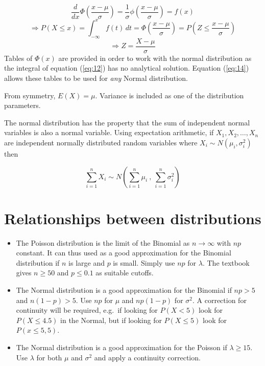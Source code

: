\documentclass[a5paper]{article}
\begin{document}
\[
  \frac{d}{dx}\Phi\left(\frac{x-\mu}{\sigma}\right) =
  \frac{1}{\sigma}\phi\left(\frac{x-\mu}{\sigma}\right) = f(x)
\]
\[
  \Rightarrow P(X\le x) = \int_{-\infty}^{x}f(t)\,dt =
  \Phi\left(\frac{x-\mu}{\sigma}\right)
  = P\left(Z\le \frac{x-\mu}{\sigma}\right)
\]
\begin{equation}\label{eq:14}
  \Rightarrow Z = \frac{X-\mu}{\sigma}
\end{equation}
Tables of $\Phi(x)$ are provided in order to work with the normal distribution
as the integral of equation (\ref{eq:12}) has no analytical solution. Equation
(\ref{eq:14}) allows these tables to be used for \textit{any} Normal
distribution.

From symmetry, $E(X)=\mu$. Variance is included as one of the distribution
parameters.

The normal distribution has the property that the sum of independent normal
variables is also a normal variable. Using expectation arithmetic, if $X_1, X_2,
\ldots, X_n$ are independent normally distributed random variables where
$X_i\sim N(\mu_i, \sigma_i^2)$ then

\begin{equation}
  \sum_{i=1}^{n}X_i \sim N\left(\sum_{i=1}^{n}\mu_i\ ,\ \sum_{i=1}^{n}\sigma_i^2\right)
\end{equation}

\section{Relationships between distributions}
\begin{itemize}
\item The Poisson distribution is the limit of the Binomial as
  $n\rightarrow\infty$ with $np$ constant. It can thus used as a good
  approximation for the Binomial distribution if $n$ is large and $p$ is small.
  Simply use $np$ for $\lambda$.
  The textbook gives \mbox{$n\ge 50$} and $p\le 0.1$ as suitable cutoffs.
\item The Normal distribution is a good approximation for the Binomial if $np>5$
  and $n(1-p)>5$. Use $np$ for $\mu$ and $np(1-p)$ for $\sigma^2$. A correction
  for continuity will be required, e.g.\ if looking for \mbox{$P(X<5)$} look for $P(X\le
  4.5)$ in the Normal, but if looking for $P(X\le5)$ look for $P(x\le 5,5)$.
\item The Normal distribution is a good approximation for the Poisson if
  $\lambda\ge 15$. Use $\lambda$ for both $\mu$ and $\sigma^2$ and apply a
  continuity correction.
\end{itemize}
\end{document}
